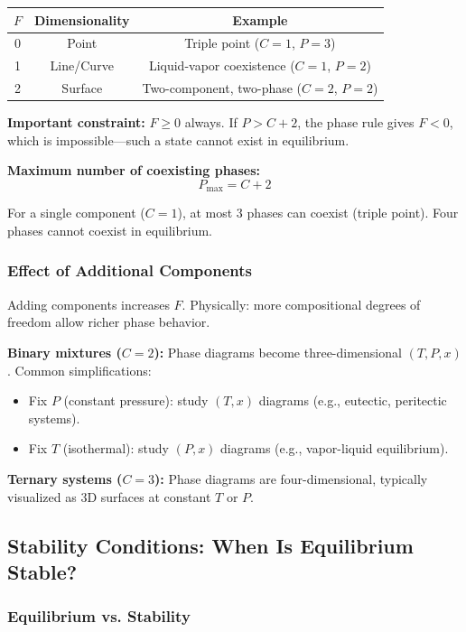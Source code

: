 \documentclass[9pt,twocoloumn]{article}
\begin{document}
\begin{center}
\begin{tabular}{ccc}
\hline
$F$ & Dimensionality & Example \\
\hline
0 & Point & Triple point ($C=1$, $P=3$) \\
1 & Line/Curve & Liquid-vapor coexistence ($C=1$, $P=2$) \\
2 & Surface & Two-component, two-phase ($C=2$, $P=2$) \\
\hline
\end{tabular}
\end{center}

\textbf{Important constraint:} $F \geq 0$ always. If $P > C + 2$, the phase rule gives $F < 0$, which is impossible—such a state cannot exist in equilibrium.

\textbf{Maximum number of coexisting phases:}
\begin{equation}
P_{\max} = C + 2
\end{equation}

For a single component ($C=1$), at most 3 phases can coexist (triple point). Four phases cannot coexist in equilibrium.

\subsubsection{Effect of Additional Components}

Adding components increases $F$. Physically: more compositional degrees of freedom allow richer phase behavior.

\textbf{Binary mixtures ($C=2$):} Phase diagrams become three-dimensional $(T, P, x)$. Common simplifications:
\begin{itemize}
    \item Fix $P$ (constant pressure): study $(T, x)$ diagrams (e.g., eutectic, peritectic systems).
    \item Fix $T$ (isothermal): study $(P, x)$ diagrams (e.g., vapor-liquid equilibrium).
\end{itemize}

\textbf{Ternary systems ($C=3$):} Phase diagrams are four-dimensional, typically visualized as 3D surfaces at constant $T$ or $P$.

\subsection{Stability Conditions: When Is Equilibrium Stable?}

\subsubsection{Equilibrium vs. Stability}
\end{document}
